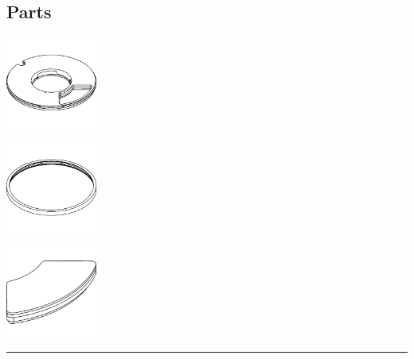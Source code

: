 \subsection{Parts}

\begin{center}
    \begin{minipage}{0.3\textwidth}
        \centering
        \includegraphics[height=3cm]{images/wireframes/bucket_lid.png}
    \end{minipage}
    \hfill
    \begin{minipage}{0.3\textwidth}
        \centering
        \includegraphics[height=3cm]{images/wireframes/bucket_lid_lockring.png}
    \end{minipage}
    \hfill
    \begin{minipage}{0.3\textwidth}
        \centering
        \includegraphics[height=3cm]{images/wireframes/bucket_lid_cap.png}
    \end{minipage}

    \vspace{8pt}
    \rule{\textwidth}{0.5pt}
    \vspace{2pt}


\end{center}
